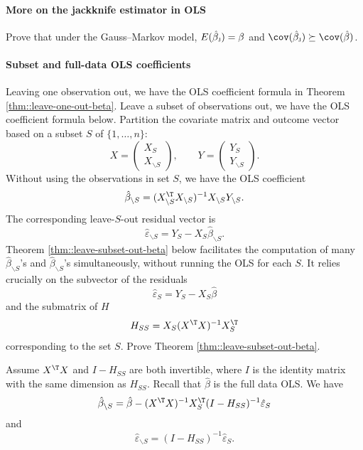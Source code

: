 \paragraph{More on the jackknife estimator in OLS}\label{hw::ols-jackknife}

Prove that under the Gauss--Markov model, 
$E(\hat{\beta}_\textsc{j} )  = \beta$ and  $\cov( \hat{\beta}_\textsc{j} ) \succeq \cov( \hat{\beta})$. 



\paragraph{Subset and full-data OLS coefficients}
\label{hw10::subset-ols-coef}


Leaving one observation out, we have the OLS coefficient formula in Theorem \ref{thm::leave-one-out-beta}. Leave a subset of observations out, we have the OLS coefficient formula below. Partition the covariate matrix and outcome vector based on a subset $S$ of $\{1, \ldots, n\}$:
$$
X = \begin{pmatrix}
X_S\\
X_{\backslash S}
\end{pmatrix},\qquad 
Y = \begin{pmatrix}
Y_S\\
Y_{\backslash S}
\end{pmatrix} .
$$  
Without using the observations in set $S$, we have the OLS coefficient 
$$
\hat\beta_{\backslash S} = (X_{\backslash S}^{\T} X_{\backslash S})^{-1} X_{\backslash S}Y_{\backslash S}.
$$
The corresponding leave-$S$-out residual vector is
$$
\hat{\varepsilon}_{\backslash S} = Y_S - X_S \hat\beta_{\backslash S}. 
$$
Theorem \ref{thm::leave-subset-out-beta} below facilitates the computation of many $\hat\beta_{\backslash S} $'s and $\hat\beta_{\backslash S}$'s simultaneously, without running the OLS for each $S$.  It relies crucially on the subvector of the residuals 
$$
\hat{\varepsilon}_S = Y_S - X_S\hat\beta 
$$  
and the submatrix of $H$
$$
H_{SS} = X_{S}(X^{\T}X)^{-1}X_{S}^{\T}
$$
corresponding to the set $S$. 
Prove Theorem \ref{thm::leave-subset-out-beta}. 

\begin{theorem}\label{thm::leave-subset-out-beta}
Assume $X^{\T}X$ and $I-H_{SS}$ are both invertible, where $I$ is the identity matrix with the same dimension as  $H_{SS}$. 
Recall that $\hat{\beta}$ is the full data OLS. 
We have
\[
\hat\beta_{\backslash S}   =\hat{\beta}- (X^{\T}X)^{-1}  X_{S}^{\T} (I-H_{SS})^{-1} \hat{\varepsilon}_S 
\]
and
$$
\hat{\varepsilon}_{\backslash S}
= (I-H_{SS})^{-1} \hat{\varepsilon}_S . 
$$
\end{theorem}






